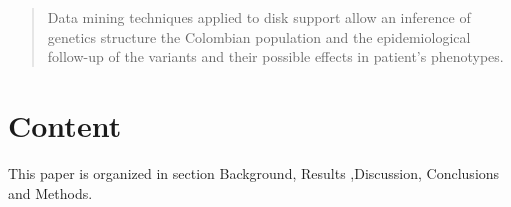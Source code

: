 \documentclass[twocolumn]{bmcart}%
\begin{document}
\begin{frontmatter}
\begin{fmbox}
\begin{abstractbox}
\begin{abstract}
Data mining techniques applied to disk support allow an inference of genetics structure the Colombian population and the epidemiological follow-up of the variants and their possible effects in patient's phenotypes.
\end{abstract}


\begin{keyword}
\end{keyword}


\end{abstractbox}
%
\end{fmbox}%

\end{frontmatter}



\section*{Content}
This paper is organized in section Background, Results ,Discussion, Conclusions and Methods. %
\end{document}

